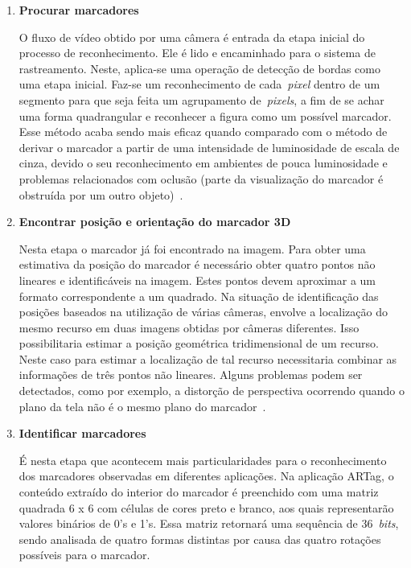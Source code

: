 		\begin{enumerate}
		  \item \textbf{Procurar marcadores}
		  
				O fluxo de vídeo obtido por uma câmera é entrada da etapa inicial do processo de
				reconhecimento. Ele é lido e encaminhado para o sistema de rastreamento. Neste, aplica-se uma
				operação de detecção de bordas como uma etapa inicial. Faz-se um reconhecimento de
				cada~\textit{pixel} dentro de um segmento para que seja feita um agrupamento de~\textit{pixels},
				a fim de se achar uma forma quadrangular e reconhecer a figura como um possível marcador. Esse
				método acaba sendo mais eficaz quando comparado com o método de derivar o marcador a partir de
				uma intensidade de luminosidade de escala de cinza, devido o seu reconhecimento em ambientes de
				pouca luminosidade e problemas relacionados com oclusão (parte da visualização do marcador é
				obstruída por um outro objeto)~\cite{artag}.
				
			\item \textbf{Encontrar posição e orientação do marcador 3D}
			
				Nesta etapa o marcador já foi encontrado na imagem. Para obter uma estimativa da posição do
				marcador é necessário obter quatro pontos não lineares e identificáveis na imagem. Estes pontos
				devem aproximar a um formato correspondente a um quadrado. Na situação de identificação das
				posições baseados na utilização de várias câmeras, envolve a localização do mesmo recurso em
				duas imagens obtidas por câmeras diferentes. Isso possibilitaria estimar a posição geométrica
				tridimensional de um recurso. Neste caso para estimar a localização de tal recurso necessitaria
				combinar as informações de três pontos não lineares. Alguns problemas podem ser detectados, como
				por exemplo, a distorção de perspectiva ocorrendo quando o plano da tela não é o mesmo plano do
				marcador~\cite{kler}.
				
			\item \textbf{Identificar marcadores}
			
				É nesta etapa que acontecem mais particularidades para o reconhecimento dos marcadores
				observadas em diferentes aplicações. Na aplicação ARTag, o conteúdo extraído do interior do
				marcador é preenchido com uma matriz quadrada 6 x 6 com células de cores preto e branco, aos
				quais representarão valores binários de 0's e 1's. Essa matriz retornará uma sequência de
				36~\textit{bits}, sendo analisada de quatro formas distintas por causa das quatro rotações
				possíveis para o marcador.
				

\end{enumerate}

